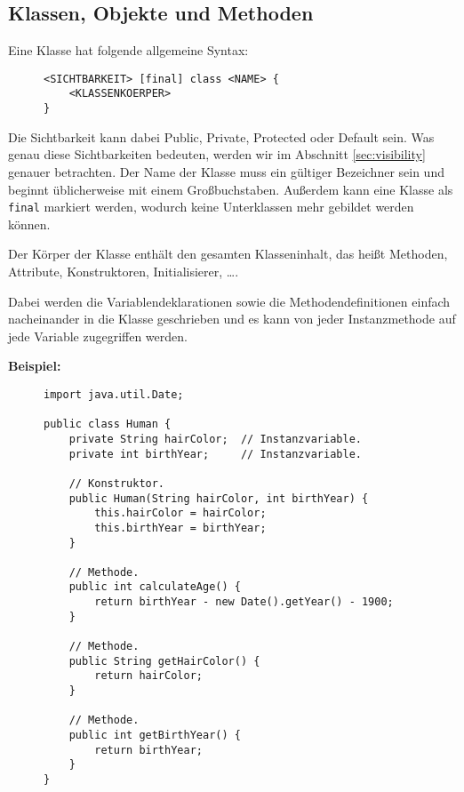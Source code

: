 
\subsection{Klassen, Objekte und Methoden}
	
	Eine Klasse hat folgende allgemeine Syntax:
	\begin{figure}[H]
		\centering
		\begin{lstlisting}
<SICHTBARKEIT> [final] class <NAME> {
	<KLASSENKOERPER>
}
\end{lstlisting}
	\end{figure}
	Die Sichtbarkeit kann dabei Public, Private, Protected oder Default sein. Was genau diese Sichtbarkeiten bedeuten, werden wir im Abschnitt \ref{sec:visibility} genauer betrachten. Der Name der Klasse muss ein gültiger Bezeichner sein und beginnt üblicherweise mit einem Großbuchstaben. Außerdem kann eine Klasse als \lstinline|final| markiert werden, wodurch keine Unterklassen mehr gebildet werden können.
	
	Der Körper der Klasse enthält den gesamten Klasseninhalt, das heißt Methoden, Attribute, Konstruktoren, Initialisierer, \dots.
	
	Dabei werden die Variablendeklarationen sowie die Methodendefinitionen einfach nacheinander in die Klasse geschrieben und es kann von jeder Instanzmethode auf jede Variable zugegriffen werden.
	
	\textbf{Beispiel:}
	\begin{figure}[H]
		\centering
		\begin{lstlisting}
import java.util.Date;

public class Human {
	private String hairColor;  // Instanzvariable.
	private int birthYear;     // Instanzvariable.

	// Konstruktor.
	public Human(String hairColor, int birthYear) {
		this.hairColor = hairColor;
		this.birthYear = birthYear;
	}

	// Methode.
	public int calculateAge() {
		return birthYear - new Date().getYear() - 1900;
	}

	// Methode.
	public String getHairColor() {
		return hairColor;
	}

	// Methode.
	public int getBirthYear() {
		return birthYear;
	}
}
\end{lstlisting}
	\end{figure}
	
